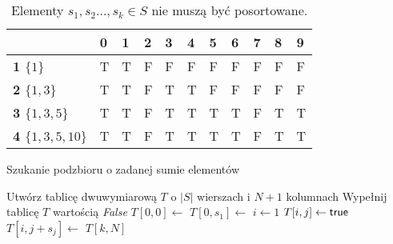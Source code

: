 \begin{table}[H]
	\centering
	\begin{tabular}{|l|l|l|l|l|l|l|l|l|l|l|}
		\hline
		& \multicolumn{1}{l|}{\textbf{0}} & \multicolumn{1}{l|}{\textbf{1}} & \multicolumn{1}{l|}{\textbf{2}} & \multicolumn{1}{l|}{\textbf{3}} & \multicolumn{1}{l|}{\textbf{4}} & \multicolumn{1}{l|}{\textbf{5}} & \multicolumn{1}{l|}{\textbf{6}} & \multicolumn{1}{l|}{\textbf{7}} & \multicolumn{1}{l|}{\textbf{8}} & \multicolumn{1}{l|}{\textbf{9}} \\ \hline
		\textbf{1 $\{1\}$} & \color{ForestGreen}T & \color{ForestGreen}T & F & F & F & F & F & F & F & F \\ \cline{1-1}
		\textbf{2 $\{1, 3\}$} & \color{ForestGreen}T & \color{ForestGreen}T & F & \color{ForestGreen}T & \color{ForestGreen}T & F & F & F & F & F \\ \cline{1-1}
		\textbf{3 $\{1, 3, 5\}$} & \color{ForestGreen}T & \color{ForestGreen}T & F & \color{ForestGreen}T & \color{ForestGreen}T & \color{ForestGreen}T & \color{ForestGreen}T & F & \color{ForestGreen}T & \color{ForestGreen}T \\ \cline{1-1}
		\textbf{4 $\{1, 3, 5, 10\}$} & \color{ForestGreen}T & \color{ForestGreen}T & F & \color{ForestGreen}T & \color{ForestGreen}T & \color{ForestGreen}T & \color{ForestGreen}T & F & \color{ForestGreen}T & \color{ForestGreen}T  \\ \cline{1-1}
		\hline
	\end{tabular}
	\caption{Elementy $s_1, s_2 \dots, s_k \in S$ nie muszą być posortowane.}
	\label{tab:suma}
\end{table}

\begin{algorithm}[H]
	\caption{Szukanie podzbioru o zadanej sumie elementów}\label{Zadanie11}
	\begin{algorithmic}[1]
		\State Utwórz tablicę dwuwymiarową $T$ o $|S|$ wierszach i $N + 1$ kolumnach 
		\State Wypełnij tablicę $T$ wartością \textit{False}
		\State $T[0, 0] \gets $ \true
		\State $T[0, s_1] \gets $ \true
		\State $i \gets 1$
		\State $T[i, j] \gets \textsf{true}$
		\State $T[i, j + s_j] \gets$ \true
		\EndIf
		\EndIf
		\EndFor 
		\EndFor
		\State \Return $T[k, N]$
		\EndProcedure 
	\end{algorithmic}
\end{algorithm}

